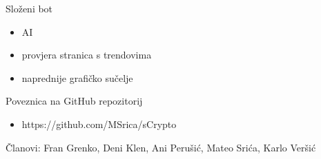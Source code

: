 \documentclass[aspectratio=169,xcolor=dvipsnames]{beamer}
\begin{document}
\begin{frame}{Složeni bot}
    \begin{itemize}
        \item AI
        \item provjera stranica s trendovima
        \item naprednije grafičko sučelje
    \end{itemize}
\end{frame}


\begin{frame}{Poveznica na GitHub repozitorij}
    \begin{itemize}
        \item https://github.com/MSrica/sCrypto\newline
    \end{itemize}
    Članovi: Fran Grenko, Deni Klen, Ani Perušić, Mateo Srića, Karlo Veršić
\end{frame}
\end{document}

